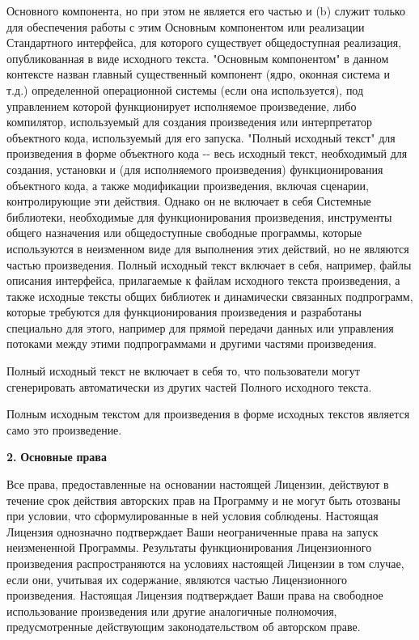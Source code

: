 Основного компонента, но при этом не является его частью и (b) служит только для обеспечения работы с этим Основным компонентом или реализации Стандартного интерфейса, для которого существует общедоступная реализация, опубликованная в виде исходного текста. "{}Основным компонентом"{} в данном контексте назван главный существенный компонент (ядро, оконная система и т.\+д.) определенной операционной системы (если она используется), под управлением которой функционирует исполняемое произведение, либо компилятор, используемый для создания произведения или интерпретатор объектного кода, используемый для его запуска. "{}Полный исходный текст"{} для произведения в форме объектного кода -\/-\/ весь исходный текст, необходимый для создания, установки и (для исполняемого произведения) функционирования объектного кода, а также модификации произведения, включая сценарии, контролирующие эти действия. Однако он не включает в себя Системные библиотеки, необходимые для функционирования произведения, инструменты общего назначения или общедоступные свободные программы, которые используются в неизменном виде для выполнения этих действий, но не являются частью произведения. Полный исходный текст включает в себя, например, файлы описания интерфейса, прилагаемые к файлам исходного текста произведения, а также исходные тексты общих библиотек и динамически связанных подпрограмм, которые требуются для функционирования произведения и разработаны специально для этого, например для прямой передачи данных или управления потоками между этими подпрограммами и другими частями произведения.

Полный исходный текст не включает в себя то, что пользователи могут сгенерировать автоматически из других частей Полного исходного текста.

Полным исходным текстом для произведения в форме исходных текстов является само это произведение.

{\bfseries{2.}} {\bfseries{Основные}} {\bfseries{права}}

Все права, предоставленные на основании настоящей Лицензии, действуют в течение срок действия авторских прав на Программу и не могут быть отозваны при условии, что сформулированные в ней условия соблюдены. Настоящая Лицензия однозначно подтверждает Ваши неограниченные права на запуск неизмененной Программы. Результаты функционирования Лицензионного произведения распространяются на условиях настоящей Лицензии в том случае, если они, учитывая их содержание, являются частью Лицензионного произведения. Настоящая Лицензия подтверждает Ваши права на свободное использование произведения или другие аналогичные полномочия, предусмотренные действующим законодательством об авторском праве.

